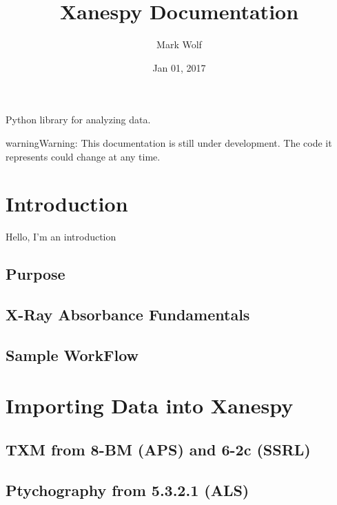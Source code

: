 \documentclass[letterpaper,10pt,english]{sphinxmanual}
\title{Xanespy Documentation}
\date{Jan 01, 2017}
\author{Mark Wolf}
\begin{document}
\maketitle
\sphinxtableofcontents
{}\label{\detokenize{index::doc}}


Python library for analyzing  data.

\begin{sphinxadmonition}{warning}{Warning:}
This documentation is still under development. The code
it represents could change at any time.
\end{sphinxadmonition}


\chapter{Introduction}
\label{\detokenize{intro::doc}}\label{\detokenize{intro:xanespy-s-documentation}}\label{\detokenize{intro:introduction}}
Hello, I'm an introduction


\section{Purpose}
\label{\detokenize{intro:purpose}}

\section{X-Ray Absorbance Fundamentals}
\label{\detokenize{intro:x-ray-absorbance-fundamentals}}

\section{Sample WorkFlow}
\label{\detokenize{intro:sample-workflow}}

\chapter{Importing Data into Xanespy}
\label{\detokenize{importing::doc}}\label{\detokenize{importing:importing-data-into-xanespy}}

\section{TXM from 8-BM (APS) and 6-2c (SSRL)}
\label{\detokenize{importing:txm-from-8-bm-aps-and-6-2c-ssrl}}

\section{Ptychography from 5.3.2.1 (ALS)}
\label{\detokenize{importing:ptychography-from-5-3-2-1-als}}
\end{document}

